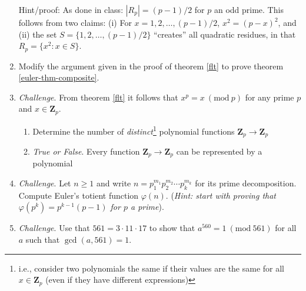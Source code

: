 \documentclass[12pt]{article}
\numberwithin{equation}{subsection}
\theoremstyle{note}
\newcommand{\Mod}[1]{\ (\mathrm{mod}\ #1)}
\begin{document}
\begin{enumerate}[label=\arabic*.]
	{\color{violet} 
	Hint/proof: As done in class: $|R_p|=(p-1)/2$ for $p$ an odd prime. This follows from two claims: (i) For $x=1,2,\dots,(p-1)/2$, $x^2=(p-x)^2$, and (ii) the set $S=\{1,2,\dots,(p-1)/2\}$ ``creates'' all quadratic residues, in that $R_p=\{x^2 : x\in S\}$.
	
	}
	
	\item \label{euler-thm-proof} Modify the argument given in the proof of theorem \ref{flt} to prove theorem \ref{euler-thm-composite}.
	\item \textit{Challenge}. From theorem \ref{flt} it follows that $x^p=x\Mod{p}$ for any prime $p$ and $x\in\mathbf{Z}_p$. 
	\begin{enumerate} 
	\item Determine the number of \textit{distinct}\footnote{i.e., consider two polynomials the same if their values are the same for all $x\in\mathbf{Z}_p$ (even if they have different expressions)} polynomial functions $\mathbf{Z}_p\to \mathbf{Z}_p$
	\item \textit{True or False}. Every function $\mathbf{Z}_p\to\mathbf{Z}_p$ can be represented by a polynomial
	\end{enumerate} 
	\item \textit{Challenge}. Let $n\geq 1$ and write $n=p_1^{m_1}p_2^{m_2}\cdots p_k^{m_k}$ for its prime decomposition. Compute Euler's totient function $\varphi(n)$. (\textit{Hint: start with proving that $\varphi(p^k)=p^{k-1}(p-1)$ for $p$ a prime}).
	\item \textit{Challenge}. \label{Carmichael} Use that $561=3\cdot 11\cdot 17$ to show that $a^{560}=1\Mod{561}$ for all $a$ such that $\gcd(a,561)=1$.

\end{enumerate}
	
\end{document}
